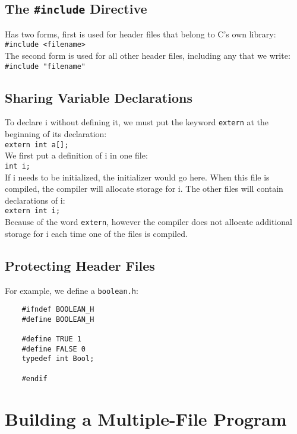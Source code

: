\documentclass[openany]{book}
\begin{document}
    \subsection*{The \texttt{\#include} Directive}
    Has two forms, first is used for header files that belong to C's own library: \\
    \texttt{\#include <filename>} \\
    The second form is used for all other header files, including any that we write: \\
    \texttt{\#include "filename"}

    \subsection*{Sharing Variable Declarations}
    To declare i without defining it, we must put the keyword \texttt{extern} at the beginning of its declaration: \\
    \texttt{extern int a[];} \\
    We first put a definition of i in one file: \\
    \texttt{int i;} \\
    If i needs to be initialized, the initializer would go here. When this file is compiled, the compiler will allocate storage for i. The other files will contain declarations of i: \\
    \texttt{extern int i;} \\
    Because of the word \texttt{extern}, however the compiler does not allocate additional storage for i each time one of the files is compiled.

    \newpage
    \subsection*{Protecting Header Files}

    For example, we define a \texttt{boolean.h}:
    \begin{lstlisting}
    #ifndef BOOLEAN_H
    #define BOOLEAN_H

    #define TRUE 1
    #define FALSE 0
    typedef int Bool;

    #endif
    \end{lstlisting}

    \section{Building a Multiple-File Program}
    
\end{document}
